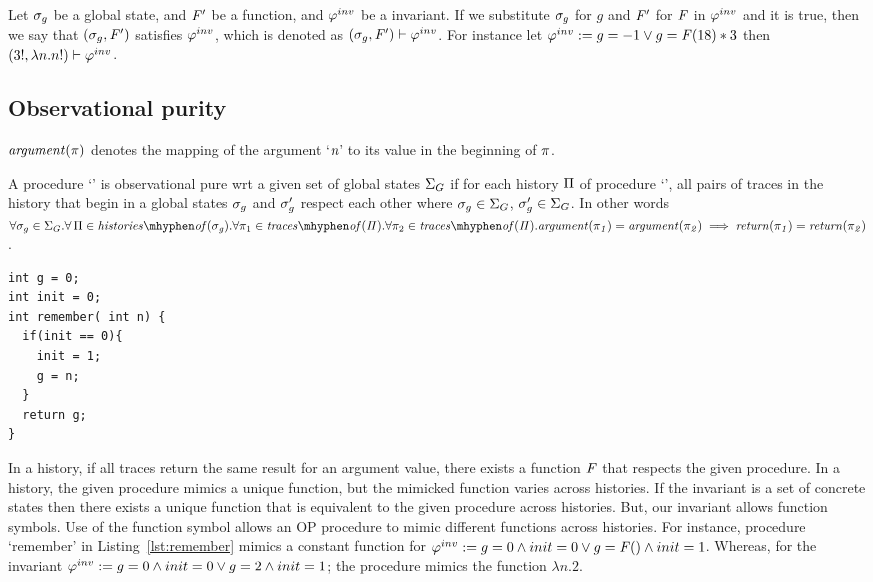 Let $\sigma_g$ be a global state, and $\mathit{F}'$ be a function, and $\varphi^{inv}$
be a invariant. If we substitute $\sigma_g$ for $g$ and $\mathit{F}'$ for $\mathit{F}$
in $\varphi^{inv}$ and it is true, then we say that $(\sigma_g, \mathit{F}')$ satisfies
$\varphi^{inv}$, which is denoted as $(\sigma_g, \mathit{F}') \vdash \varphi^{inv}$. For
instance let $\varphi^{inv} := g = -1 \vee g = \mathit{F}(18) * 3$ then $(3!, \lambda
n. n!) \vdash \varphi^{inv}$.

\subsection{Observational purity}\label{sec:op}

\begin{definition}
  $\mathit{argument(\pi)}$ denotes the mapping of the argument `$\textit{n}$' to its
  value in the beginning of $\pi$.
\end{definition}


\begin{definition}
  A procedure `\foo' is observational pure wrt a given set of global
  states $\Sigma_G$ if for each history $\Pi$ of procedure
  `\foo', all pairs of traces in the history that begin in a global
  states $\sigma_g$ and $\sigma_g'$ respect each other where $\sigma_g
  \in \Sigma_G$, $\sigma_g' \in \Sigma_G$.  In other words
  $\forall \gmap \in \gmaps.\forall \, \history \in
  \historyOf{\gmap}. \forall \trace_1 \in
  \tracesOf{\history}. \forall \trace_2 \in
  \tracesOf{\history}.\\ \param{\trace_1} = \param{\trace_2} \implies
  \return{\trace_1} = \return{\trace_2}$.
\end{definition}

\begin{lstlisting}[caption={Procedure `remember' : always returns the
      argument from its first call}, label=lst:remember]
int g = 0;
int init = 0;
int remember( int n) {
  if(init == 0){
    init = 1;
    g = n;
  }
  return g;
}
\end{lstlisting}

In a history, if all traces return the same result for an argument
value, there exists a function $\mathit{F}$ that respects the given
procedure. In a history, the given procedure mimics a unique function,
but the mimicked function varies across histories. If the invariant is
a set of concrete states then there exists a unique function that is
equivalent to the given procedure across histories. But, our invariant
allows function symbols. Use of the function symbol allows an OP
procedure to mimic different functions across histories. For instance,
procedure `remember' in Listing~\ref{lst:remember} mimics a constant
function for $\varphi^{inv} := g=0 \wedge init=0 \vee g= \mathit{F}() \wedge
init=1$. Whereas, for the invariant $\varphi^{inv} := g=0 \wedge init=0 \vee
g=2 \wedge init=1$; the procedure mimics the function $\lambda n.2$.
